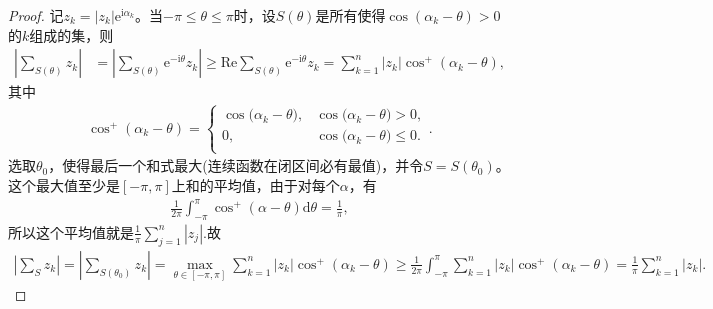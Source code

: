 \documentclass[../../main.tex]{subfiles}%
\begin{document}
\begin{proof}

记$z_k = |z_k| \mathrm{e}^{\mathrm{i}\alpha_k}$。当$-\pi \leqslant \theta \leqslant \pi$时，设$S(\theta)$是所有使得$\cos(\alpha_k - \theta) > 0$的$k$组成的集，则
\begin{align*}
\left| \sum_{S(\theta)} z_k \right| &= \left| \sum_{S(\theta)} \mathrm{e}^{-\mathrm{i}\theta} z_k \right| \geqslant \mathrm{Re}\sum_{S(\theta)} \mathrm{e}^{-\mathrm{i}\theta} z_k = \sum_{k=1}^{n} |z_k| \cos^+(\alpha_k - \theta),
\end{align*}
其中
\begin{align*}
\cos ^+(\alpha _k-\theta )=\begin{cases}
\cos\mathrm{(}\alpha _k-\theta ),&\cos\mathrm{(}\alpha _k-\theta )>0,\\
0,&\cos\mathrm{(}\alpha _k-\theta )\leqslant 0.\\
\end{cases}.
\end{align*}
选取$\theta_0$，使得最后一个和式最大(连续函数在闭区间必有最值)，并令$S = S(\theta_0)$。这个最大值至少是$[-\pi, \pi]$上和的平均值，由于对每个$\alpha$，有
\begin{align*}
\frac{1}{2\pi} \int_{-\pi}^{\pi} \cos^+(\alpha - \theta) \mathrm{d}\theta = \frac{1}{\pi},
\end{align*}
所以这个平均值就是$\frac{1}{\pi} \sum_{j=1}^{n} |z_j|.$故
\begin{align*}
\left| \sum_S{z_k} \right|=\left| \sum_{S(\theta _0)}{z_k} \right|=\underset{\theta \in \left[ -\pi ,\pi \right]}{\max}\sum_{k=1}^n{|z_k|\cos ^+(\alpha _k-\theta )}\geqslant \frac{1}{2\pi}\int_{-\pi}^{\pi}{\sum_{k=1}^n{|z_k|\cos ^+(\alpha _k-\theta )}}=\frac{1}{\pi}\sum_{k=1}^n{|z_k|}.
\end{align*}


\end{proof}
\end{document}
